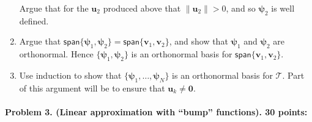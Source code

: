 \documentclass[11pt,twoside]{article}
\begin{document}
\begin{enumerate}[label=(\alph*)]
 Argue that for the $\mathbf{u}_2$ produced above that $\|\mathbf{u}_2\|>0$, and so $\mathbf{\psi}_2$ is well defined.

        \item Argue that $\mathsf{span}\{\mathbf{\psi}_1,\mathbf{\psi}_2\} = \mathsf{span}\{\mathbf{v}_1,\mathbf{v}_2\}$, and show that $\mathbf{\psi}_1$ and $\mathbf{\psi}_2$ are orthonormal.  Hence $\{\mathbf{\psi}_1,\mathbf{\psi}_2\}$ is an orthonormal basis for $\mathsf{span}\{\mathbf{v}_1,\mathbf{v}_2\}$.
        
        \item Use induction to show that $\{\mathbf{\psi}_1,\ldots,\mathbf{\psi}_N\}$ is an orthonormal basis for $\mathcal{T}$.  Part of this argument will be to ensure that $\mathbf{u}_k\not=\mathbf{0}$.
\end{enumerate}


\paragraph{Problem 3. (Linear approximation with ``bump'' functions). 30 points:}
\end{document}
